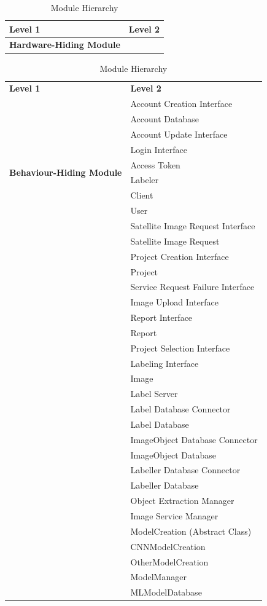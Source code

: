 \documentclass[12pt, titlepage]{article}
\begin{document}
\begin{table}[h!]
  \centering
  \begin{tabular}{p{} p{}}
  \toprule
  \textbf{Level 1} & \textbf{Level 2}\\
  \midrule
  
  \textbf{Hardware-Hiding Module} & ~ \\
  \midrule
\end{tabular}
\caption{Module Hierarchy}
\label{TblMH}
\end{table}
\begin{table}[h!]
  \centering
  \begin{tabular}{p{} p{}}
  \toprule
  \textbf{Level 1} & \textbf{Level 2}\\
  \multirow{10}{0.3\textwidth}{\textbf{Behaviour-Hiding Module}} 
   & Account Creation Interface\\
   & Account Database\\
   & Account Update Interface\\
   & Login Interface\\
   & Access Token\\
   & Labeler\\
   & Client\\
   & User\\
   & Satellite Image Request Interface\\
   & Satellite Image Request\\
   & Project Creation Interface\\
   & Project\\
   & Service Request Failure Interface\\
   & Image Upload Interface\\
   & Report Interface\\
   & Report\\
   & Project Selection Interface\\
   & Labeling Interface\\
   & Image\\
   & Label Server\\
   & Label Database Connector\\
   & Label Database\\
   & ImageObject Database Connector\\
   & ImageObject Database\\
   & Labeller Database Connector\\
   & Labeller Database\\
   & Object Extraction Manager\\
   & Image Service Manager\\
   & ModelCreation (Abstract Class)\\
   & CNNModelCreation\\
   & OtherModelCreation\\
   & ModelManager\\
   & MLModelDatabase\\
  \midrule
\end{tabular}
\caption{Module Hierarchy}
\label{TblMH}
\end{table}
\end{document}
